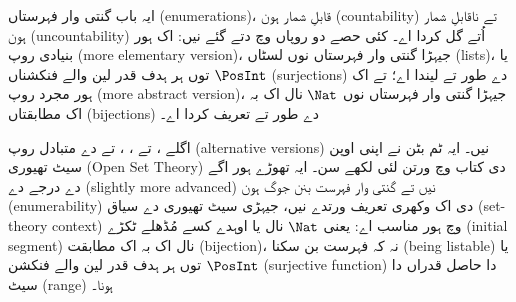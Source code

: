 \documentclass[../../../include/open-logic-chapter]{subfiles}
\begin{document}

\begin{editorial}
ایہ باب گنتی وار فہرستاں (enumerations)، قابلِ شمار ہون
(countability) تے ناقابلِ شمار ہون (uncountability) اُتے گل کردا اے۔
کئی حصے دو روپاں وچ دتے گئے نیں: اک ہور بنیادی روپ (more elementary
version)، جیہڑا گنتی وار فہرستاں نوں لسٹاں (lists)، یا $\PosInt$ توں
ہر ہدف قدر لین والے فنکشناں (surjections) دے طور تے لیندا اے؛ تے اک
ہور مجرد روپ (more abstract version)، جیہڑا گنتی وار فہرستاں نوں
$\Nat$ نال اک بہ اک مطابقتاں (bijections) دے طور تے تعریف کردا اے۔
\end{editorial}











\begin{editorial}
اگلے ،
 تے ،
،  تے
 دے متبادل روپ (alternative versions) نیں۔
ایہ ٹم بٹن نے اپنی
اوپن سیٹ تھیوری (Open Set Theory) دی کتاب وچ ورتن لئی لکھے سن۔ ایہ
تھوڑے ہور اگے دے درجے دے (slightly more advanced) نیں تے گنتی وار
فہرست بنن جوگ ہون (enumerability) دی اک وکھری تعریف ورتدے نیں، جیہڑی
سیٹ تھیوری دے سیاق (set-theory context) وچ ہور مناسب اے: یعنی $\Nat$
نال یا اوہدے کسے مُڈھلے ٹکڑے (initial segment) نال اک بہ اک مطابقت
(bijection)، نہ کہ فہرست بن سکنا (being listable) یا $\PosInt$ توں ہر
ہدف قدر لین والے فنکشن (surjective function) دا حاصل قدراں دا سیٹ
(range) ہونا۔
\end{editorial}


\OLEndChapterHook
\end{document}
